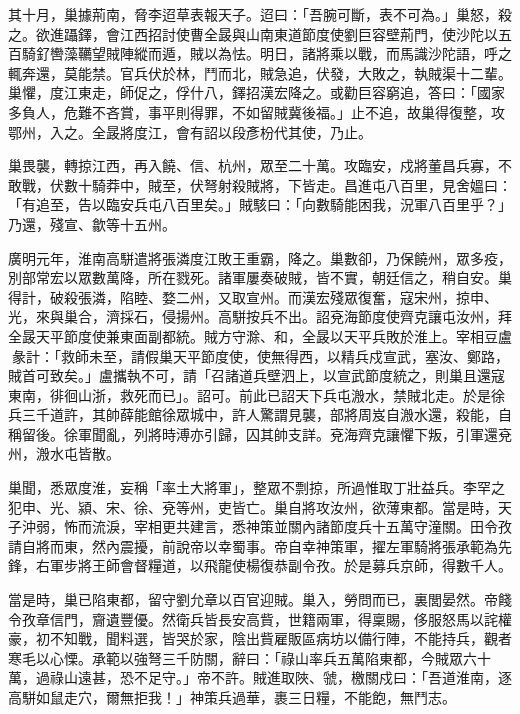 \begin{pinyinscope}
 其十月，巢據荊南，脅李迢草表報天子。迢曰：「吾腕可斷，表不可為。」巢怒，殺之。欲進躡鐸，會江西招討使曹全晸與山南東道節度使劉巨容壁荊門，使沙陀以五百騎釕轡藻韉望賊陣縱而遁，賊以為怯。明日，諸將乘以戰，而馬識沙陀語，呼之輒奔還，莫能禁。官兵伏於林，鬥而北，賊急追，伏發，大敗之，執賊渠十二輩。巢懼，度江東走，師促之，俘什八，鐸招漢宏降之。或勸巨容窮追，答曰：「國家多負人，危難不吝賞，事平則得罪，不如留賊冀後福。」止不追，故巢得復整，攻鄂州，入之。全晸將度江，會有詔以段彥枌代其使，乃止。



 巢畏襲，轉掠江西，再入饒、信、杭州，眾至二十萬。攻臨安，戍將董昌兵寡，不敢戰，伏數十騎莽中，賊至，伏弩射殺賊將，下皆走。昌進屯八百里，見舍媼曰：「有追至，告以臨安兵屯八百里矣。」賊駭曰：「向數騎能困我，況軍八百里乎？」乃還，殘宣、歙等十五州。



 廣明元年，淮南高駢遣將張潾度江敗王重霸，降之。巢數卻，乃保饒州，眾多疫，別部常宏以眾數萬降，所在戮死。諸軍屢奏破賊，皆不實，朝廷信之，稍自安。巢得計，破殺張潾，陷睦、婺二州，又取宣州。而漢宏殘眾復奮，寇宋州，掠申、光，來與巢合，濟採石，侵揚州。高駢按兵不出。詔兗海節度使齊克讓屯汝州，拜全晸天平節度使兼東面副都統。賊方守滁、和，全晸以天平兵敗於淮上。宰相豆盧彖計：「救師未至，請假巢天平節度使，使無得西，以精兵戍宣武，塞汝、鄭路，賊首可致矣。」盧攜執不可，請「召諸道兵壁泗上，以宣武節度統之，則巢且還寇東南，徘徊山浙，救死而已」。詔可。前此已詔天下兵屯溵水，禁賊北走。於是徐兵三千道許，其帥薛能館徐眾城中，許人驚謂見襲，部將周岌自溵水還，殺能，自稱留後。徐軍聞亂，列將時溥亦引歸，囚其帥支詳。兗海齊克讓懼下叛，引軍還兗州，溵水屯皆散。



 巢聞，悉眾度淮，妄稱「率土大將軍」，整眾不剽掠，所過惟取丁壯益兵。李罕之犯申、光、潁、宋、徐、兗等州，吏皆亡。巢自將攻汝州，欲薄東都。當是時，天子沖弱，怖而流淚，宰相更共建言，悉神策並關內諸節度兵十五萬守潼關。田令孜請自將而東，然內震擾，前說帝以幸蜀事。帝自幸神策軍，擢左軍騎將張承範為先鋒，右軍步將王師會督糧道，以飛龍使楊復恭副令孜。於是募兵京師，得數千人。



 當是時，巢已陷東都，留守劉允章以百官迎賊。巢入，勞問而已，裏閭晏然。帝餞令孜章信門，齎遺豐優。然衛兵皆長安高貲，世籍兩軍，得稟賜，侈服怒馬以詫權豪，初不知戰，聞料選，皆哭於家，陰出貲雇販區病坊以備行陣，不能持兵，觀者寒毛以心慄。承範以強弩三千防關，辭曰：「祿山率兵五萬陷東都，今賊眾六十萬，過祿山遠甚，恐不足守。」帝不許。賊進取陜、虢，檄關戍曰：「吾道淮南，逐高駢如鼠走穴，爾無拒我！」神策兵過華，裹三日糧，不能飽，無鬥志。




\end{pinyinscope}
